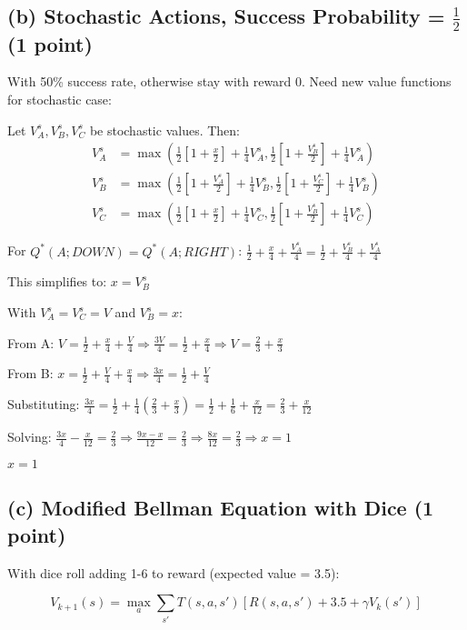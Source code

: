 \documentclass[11pt]{article}
\begin{document}
\subsection{(b) Stochastic Actions, Success Probability = $\frac{1}{2}$ (1 point)}

With 50\% success rate, otherwise stay with reward 0. Need new value functions for stochastic case:

Let $V_A^s, V_B^s, V_C^s$ be stochastic values. Then:
\begin{align*}
V_A^s &= \max(\frac{1}{2}[1 + \frac{x}{2}] + \frac{1}{4}V_A^s, \frac{1}{2}[1 + \frac{V_B^s}{2}] + \frac{1}{4}V_A^s) \\
V_B^s &= \max(\frac{1}{2}[1 + \frac{V_A^s}{2}] + \frac{1}{4}V_B^s, \frac{1}{2}[1 + \frac{V_C^s}{2}] + \frac{1}{4}V_B^s) \\
V_C^s &= \max(\frac{1}{2}[1 + \frac{x}{2}] + \frac{1}{4}V_C^s, \frac{1}{2}[1 + \frac{V_B^s}{2}] + \frac{1}{4}V_C^s)
\end{align*}

For $Q^*(A;DOWN) = Q^*(A;RIGHT)$:
$\frac{1}{2} + \frac{x}{4} + \frac{V_A^s}{4} = \frac{1}{2} + \frac{V_B^s}{4} + \frac{V_A^s}{4}$

This simplifies to: $x = V_B^s$

With $V_A^s = V_C^s = V$ and $V_B^s = x$:

From A: $V = \frac{1}{2} + \frac{x}{4} + \frac{V}{4} \Rightarrow \frac{3V}{4} = \frac{1}{2} + \frac{x}{4} \Rightarrow V = \frac{2}{3} + \frac{x}{3}$

From B: $x = \frac{1}{2} + \frac{V}{4} + \frac{x}{4} \Rightarrow \frac{3x}{4} = \frac{1}{2} + \frac{V}{4}$

Substituting: $\frac{3x}{4} = \frac{1}{2} + \frac{1}{4}(\frac{2}{3} + \frac{x}{3}) = \frac{1}{2} + \frac{1}{6} + \frac{x}{12} = \frac{2}{3} + \frac{x}{12}$

Solving: $\frac{3x}{4} - \frac{x}{12} = \frac{2}{3} \Rightarrow \frac{9x - x}{12} = \frac{2}{3} \Rightarrow \frac{8x}{12} = \frac{2}{3} \Rightarrow x = 1$

$\boxed{x = 1}$

\subsection{(c) Modified Bellman Equation with Dice (1 point)}

With dice roll adding 1-6 to reward (expected value = 3.5):

$$\boxed{V_{k+1}(s) = \max_a \sum_{s'} T(s,a,s')[R(s,a,s') + 3.5 + \gamma V_k(s')]}$$
\end{document}
